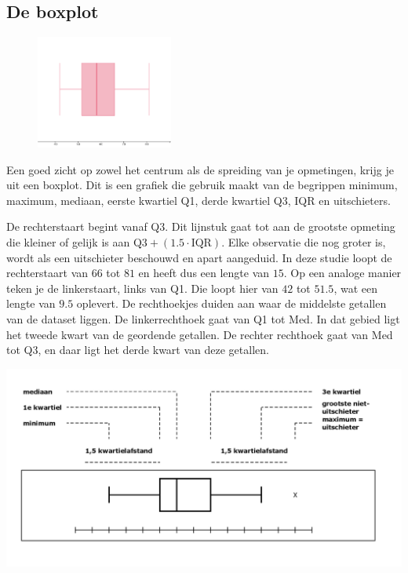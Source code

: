 \documentclass[12pt,twoside]{article}
\begin{document}
\needspace{8cm}
\subsection{De boxplot}

\begin{figure}
  \vspace{-1cm}
  \includegraphics[width=0.4\textwidth]{boxplot}
\end{figure}

Een goed zicht op zowel het centrum als de spreiding van je opmetingen, krijg je uit een boxplot. Dit
is een grafiek die gebruik maakt van de begrippen minimum, maximum, mediaan, eerste kwartiel
Q1, derde kwartiel Q3, IQR en uitschieters.

De rechterstaart begint vanaf Q3. Dit lijnstuk gaat tot aan de grootste opmeting die kleiner of
gelijk is aan $\mbox{Q3} + (1.5\cdot\mbox{IQR})$. Elke observatie die nog groter is, wordt als een uitschieter
beschouwd en apart aangeduid. In deze studie loopt de rechterstaart van $66$ tot $81$ en heeft
dus een lengte van $15$. Op een analoge manier teken je de linkerstaart, links van Q1. Die
loopt hier van $42$ tot $51.5$, wat een lengte van $9.5$ oplevert.
De rechthoekjes duiden aan waar de middelste getallen van de dataset liggen. De
linkerrechthoek gaat van Q1 tot Med. In dat gebied ligt het tweede kwart van de geordende
getallen. De rechter rechthoek gaat van Med tot Q3, en daar ligt het derde kwart van deze
getallen.

\begin{center}
  \includegraphics[width=\textwidth]{boxplot-schema}
\end{center}
\end{document}
